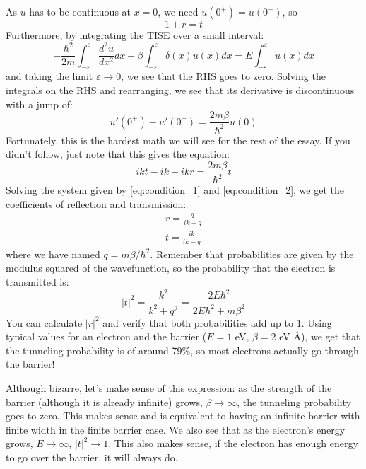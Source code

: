 \documentclass{article}
\begin{document}
As $u$ has to be continuous at $x=0$, we need $u(0^+)=u(0^-)$, so
\begin{equation}
    1+r=t \label{eq:condition_1}
\end{equation}
Furthermore, by integrating the TISE over a small interval:
\begin{equation}
    -\frac{\hbar^2}{2m}\int_{-\varepsilon}^{\varepsilon} \frac{d^2u}{dx^2}dx + \beta\int_{-\varepsilon}^{\varepsilon} \delta(x)u(x)dx = E\int_{-\varepsilon}^{\varepsilon} u(x)dx
\end{equation}
and taking the limit $\varepsilon\to0$, we see that the RHS goes to zero. Solving the integrals on the RHS and rearranging, we see that its derivative is discontinuous with a jump of:
\begin{equation*}
    u'(0^+)-u'(0^-)=\frac{2m\beta}{\hbar^2}u(0)
\end{equation*}
Fortunately, this is the hardest math we will see for the rest of the essay. If you didn't follow, just note that this gives the equation:
\begin{equation}
    ikt-ik+ikr=\frac{2m\beta}{\hbar^2}t \label{eq:condition_2}
\end{equation}
Solving the system given by \eqref{eq:condition_1} and \eqref{eq:condition_2}, we get the coefficients of reflection and transmission:
\begin{gather*}
    r=\frac{q}{ik-q}\\
    t=\frac{ik}{ik-q}
\end{gather*}
where we have named $q=m\beta/\hbar^2$. Remember that probabilities are given by the modulus squared of the wavefunction, so the probability that the electron is transmitted is:
\begin{equation*}
    |t|^2=\frac{k^2}{k^2+q^2}=\frac{2E\hbar^2}{2E\hbar^2+m\beta^2}
\end{equation*}
You can calculate $|r|^2$ and verify that both probabilities add up to 1. Using typical values for an electron and the barrier ($E = 1$ eV, $\beta = 2 $ eV Å), we get that the tunneling probability is of around 79\%, so most electrons actually go through the barrier!

Although bizarre, let's make sense of this expression: as the strength of the barrier (although it is already infinite) grows, $\beta \to \infty$, the tunneling probability goes to zero. This makes sense and is equivalent to having an infinite barrier with finite width in the finite barrier case. We also see that as the electron's energy grows, $E\to\infty$, $|t|^2\to 1$. This also makes sense, if the electron has enough energy to go over the barrier, it will always do.
\end{document}
